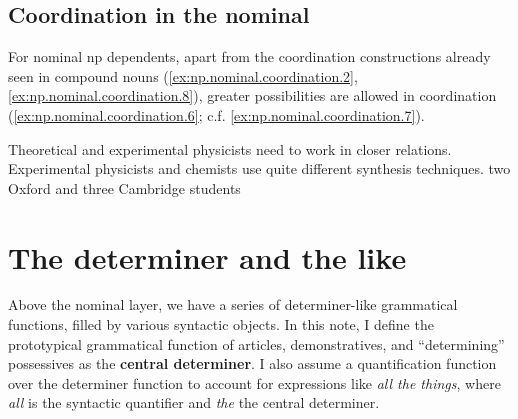 \documentclass[UTF8, a4paper, oneside, scheme=plain, 12pt]{ctexbook}
\newcommand*{\concept}[1]{\textbf{#1}}
\newcommand{\form}[1]{\emph{#1}}
\begin{document}
\subsection{Coordination in the nominal}\label{sec:np.nominal.coordination}


For nominal \acs{np} dependents, 
apart from the coordination constructions 
already seen in compound nouns 
(\ref{ex:np.nominal.coordination.2}, 
\ref{ex:np.nominal.coordination.8}),
greater possibilities are allowed in coordination
(\ref{ex:np.nominal.coordination.6}; c.f. \ref{ex:np.nominal.coordination.7}). 

\begin{exe}
    \ex\label{ex:np.nominal.coordination.2} Theoretical and experimental physicists need to work in closer relations.
    \ex\label{ex:np.nominal.coordination.8} Experimental physicists and chemists use 
    quite different synthesis techniques. 
    \ex\label{ex:np.nominal.coordination.6} two Oxford and three Cambridge students 
\end{exe}

\section{The determiner and the like}\label{sec:np.det}

Above the nominal layer, 
we have a series of determiner-like grammatical functions,
filled by various syntactic objects.
In this note, 
I define the prototypical grammatical function of articles, demonstratives, 
and ``determining'' possessives as the \concept{central determiner}.
I also assume a quantification function over the determiner function
to account for expressions like \form{all the things},
where \form{all} is the syntactic quantifier and \form{the} the central determiner.
\end{document}
